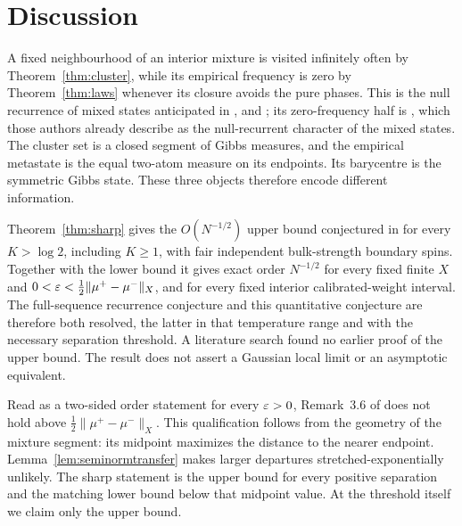 \section{Discussion}\label{sec:discussion}
A fixed neighbourhood of an interior mixture is visited infinitely often by Theorem~\ref{thm:cluster}, while its empirical frequency is zero by Theorem~\ref{thm:laws} whenever its closure avoids the pure phases. This is the null recurrence of mixed states anticipated in \cite{EMN02}, \cite[Section~12]{vENS05} and \cite[Remark~3.2]{vENS06}; its zero-frequency half is \cite[Theorem~3.4]{vENS05}, which those authors already describe as the null-recurrent character of the mixed states. The cluster set is a closed segment of Gibbs measures, and the empirical metastate is the equal two-atom measure on its endpoints. Its barycentre is the symmetric Gibbs state. These three objects therefore encode different information.

Theorem~\ref{thm:sharp} gives the $O(N^{-1/2})$ upper bound conjectured in \cite[Remark~3.6]{vENS05} for every $K>\log2$, including $K\ge1$, with fair independent bulk-strength boundary spins. Together with the lower bound it gives exact order $N^{-1/2}$ for every fixed finite $X$ and $0<\varepsilon<\tfrac12\|\mu^+-\mu^-\|_X$, and for every fixed interior calibrated-weight interval. The full-sequence recurrence conjecture and this quantitative conjecture are therefore both resolved, the latter in that temperature range and with the necessary separation threshold. A literature search found no earlier proof of the upper bound. The result does not assert a Gaussian local limit or an asymptotic equivalent.

Read as a two-sided order statement for every $\varepsilon>0$, Remark~3.6 of \cite{vENS05} does not hold above $\tfrac12\|\mu^+-\mu^-\|_X$. This qualification follows from the geometry of the mixture segment: its midpoint maximizes the distance to the nearer endpoint. Lemma~\ref{lem:seminormtransfer} makes larger departures stretched-exponentially unlikely. The sharp statement is the upper bound for every positive separation and the matching lower bound below that midpoint value. At the threshold itself we claim only the upper bound.

